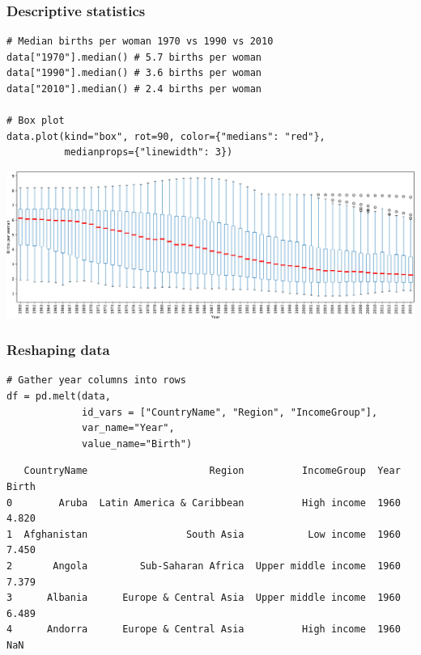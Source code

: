 \documentclass[pdf]{beamer}
\begin{document}
\begin{frame}[fragile]
\frametitle{Descriptive statistics}

\begin{lstlisting}[style=python]
# Median births per woman 1970 vs 1990 vs 2010
data["1970"].median() # 5.7 births per woman
data["1990"].median() # 3.6 births per woman 
data["2010"].median() # 2.4 births per woman

# Box plot
data.plot(kind="box", rot=90, color={"medians": "red"}, 
          medianprops={"linewidth": 3})
\end{lstlisting}

\vspace{-0.6cm}
\begin{center}
	\includegraphics[width=\textwidth]{boxplot.pdf}
\end{center}

\end{frame}

\begin{frame}[fragile]
\frametitle{Reshaping data}

\begin{lstlisting}[style=python]
# Gather year columns into rows
df = pd.melt(data, 
             id_vars = ["CountryName", "Region", "IncomeGroup"], 
             var_name="Year", 
             value_name="Birth")
\end{lstlisting}

{\fontsize{8}{8}\selectfont
\begin{verbatim}
   CountryName                     Region          IncomeGroup  Year  Birth
0        Aruba  Latin America & Caribbean          High income  1960  4.820
1  Afghanistan                 South Asia           Low income  1960  7.450
2       Angola         Sub-Saharan Africa  Upper middle income  1960  7.379
3      Albania      Europe & Central Asia  Upper middle income  1960  6.489
4      Andorra      Europe & Central Asia          High income  1960    NaN 
\end{verbatim}}

\end{frame}
\end{document}
